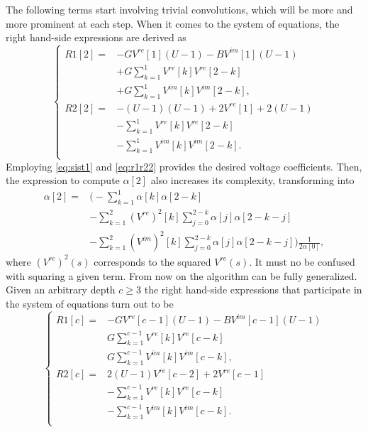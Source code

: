 \documentclass[conference]{IEEEtran}
\begin{document}
The following terms start involving trivial convolutions, which will be more and more prominent at each step. When it comes to the system of equations, the right hand-side expressions are derived as
\begin{equation}
\begin{cases}
  R1[2]=&-GV^{re}[1](U-1)-BV^{im}[1](U-1)\\
  &+G\sum_{k=1}^1V^{re}[k]V^{re}[2-k]\\
  &+G\sum_{k=1}^1V^{im}[k]V^{im}[2-k],\\
  R2[2]=&-(U-1)(U-1)+2V^{re}[1]+2(U-1)\\
  &-\sum_{k=1}^1V^{re}[k]V^{re}[2-k]\\
  &-\sum_{k=1}^1V^{im}[k]V^{im}[2-k].\\
\end{cases}
  \label{eq:r1r22}
\end{equation}
Employing \eqref{eq:sist1} and \eqref{eq:r1r22} provides the desired voltage coefficients. Then, the expression to compute $\alpha[2]$ also increases its complexity, transforming into
\begin{equation}
  \begin{split}
  \alpha[2] =& \biggl(-\sum_{k=1}^1\alpha[k]\alpha[2-k]\\
  &-\sum_{k=1}^2(V^{re})^2[k]\sum_{j=0}^{2-k}\alpha[j]\alpha[2-k-j]\\
  &-\sum_{k=1}^2(V^{im})^2[k]\sum_{j=0}^{2-k}\alpha[j]\alpha[2-k-j]\biggr)\frac{1}{2\alpha[0]},
  \end{split}
  \label{eq:alph2}
\end{equation}
where $(V^{re})^2(s)$ corresponds to the squared $V^{re}(s)$. It must no be confused with squaring a given term. From now on the algorithm can be fully generalized. Given an arbitrary depth $c\geq 3$ the right hand-side expressions that participate in the system of equations turn out to be
\begin{equation}
\begin{cases}
  R1[c]=&-GV^{re}[c-1](U-1)-BV^{im}[c-1](U-1)\\
  &G\sum_{k=1}^{c-1}V^{re}[k]V^{re}[c-k]\\
  &G\sum_{k=1}^{c-1}V^{im}[k]V^{im}[c-k],\\
  R2[c]=&2(U-1)V^{re}[c-2]+2V^{re}[c-1]\\
  &-\sum_{k=1}^{c-1}V^{re}[k]V^{re}[c-k]\\
  &-\sum_{k=1}^{c-1}V^{im}[k]V^{im}[c-k].\\
\end{cases}
  \label{eq:rhsc}
\end{equation}
\end{document}
